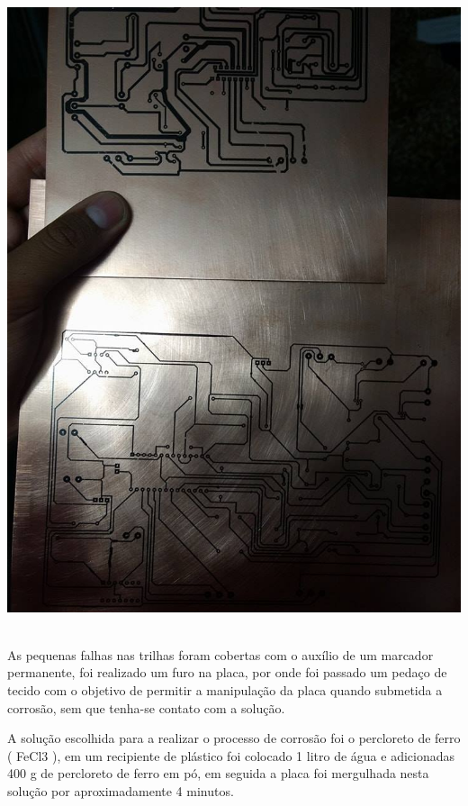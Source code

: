 \begin{center}
    \includegraphics[scale=0.3]{figuras/tinta}
\label{tinta}
   \end{center}

As pequenas falhas nas trilhas foram cobertas com o auxílio de um marcador permanente, foi realizado um furo na placa, por onde foi passado um pedaço de tecido com o objetivo de permitir a manipulação da placa quando submetida a corrosão, sem que tenha-se contato com a solução. 

A solução escolhida para a realizar o processo de corrosão foi o percloreto de ferro ( FeCl3 ), em um recipiente de plástico foi colocado 1 litro de água e adicionadas 400 g de percloreto de ferro em pó, em seguida a placa foi mergulhada nesta solução por aproximadamente 4 minutos. 

